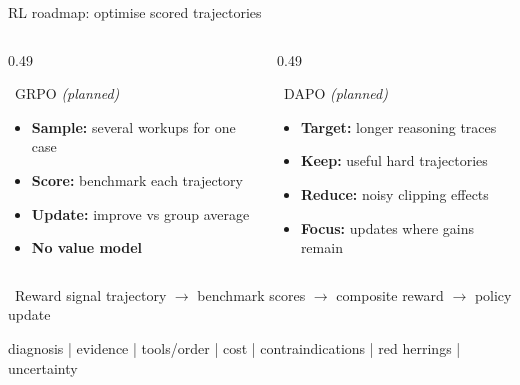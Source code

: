 \documentclass[aspectratio=169,t]{beamer}
\begin{document}
\begin{frame}{RL roadmap: optimise scored trajectories}
  \begin{columns}[T,onlytextwidth]
    \begin{column}{0.49\textwidth}
      \begin{block}{\faRandom\;\, GRPO \emph{(planned)}}
        \scriptsize
        \begin{itemize}\setlength\itemsep{0.03em}
          \item \textbf{Sample:} several workups for one case
          \item \textbf{Score:} benchmark each trajectory
          \item \textbf{Update:} improve vs group average
          \item \textbf{No value model}
        \end{itemize}
      \end{block}
    \end{column}%
    \hfill
    \begin{column}{0.49\textwidth}
      \begin{exampleblock}{\faSlidersH\;\, DAPO \emph{(planned)}}
        \scriptsize
        \begin{itemize}\setlength\itemsep{0.03em}
          \item \textbf{Target:} longer reasoning traces
          \item \textbf{Keep:} useful hard trajectories
          \item \textbf{Reduce:} noisy clipping effects
          \item \textbf{Focus:} updates where gains remain
        \end{itemize}
      \end{exampleblock}
    \end{column}
  \end{columns}

  \vspace{0.8mm}
  \begin{alertblock}{\faClipboardCheck\;\, Reward signal}
    \scriptsize
    \centering
    trajectory $\rightarrow$ benchmark scores $\rightarrow$ composite reward $\rightarrow$ policy update

    \vspace{0.3mm}
    \tiny
    diagnosis \;|\; evidence \;|\; tools/order \;|\; cost \;|\; contraindications \;|\; red herrings \;|\; uncertainty
  \end{alertblock}
\end{frame}
\end{document}
